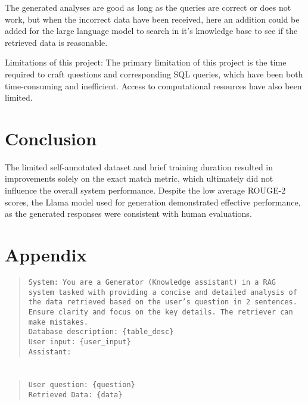 \documentclass[11pt]{article}
\begin{document}
The generated analyses are good as long as the queries are correct or does not work, but when the incorrect data have been received, here an addition could be added for the large language model to search in it's knowledge base to see if the retrieved data is reasonable.

Limitations of this project:
The primary limitation of this project is the time required to craft questions and corresponding SQL queries, which have been both time-consuming and inefficient. Access to computational resources have also been limited. 



\section{Conclusion}

The limited self-annotated dataset and brief training duration resulted in improvements solely on the exact match metric, which ultimately did not influence the overall system performance. 
Despite the low average ROUGE-2 scores, the Llama model used for generation demonstrated effective performance, as the generated responses were consistent with human evaluations.





\newpage
\appendix
\section{Appendix}

\label{sec:appendix}



\begin{quote}
\texttt{System: You are a Generator (Knowledge assistant) in a RAG system tasked with providing a concise and detailed analysis of the data retrieved based on the user's question in 2 sentences. Ensure clarity and focus on the key details. The retriever can make mistakes.}
\\
\texttt{Database description: \{table\_desc\}}
\\
\texttt{User input: \{user\_input\}}
\\
\texttt{Assistant:}
\label{append:8}
\end{quote}


\section{}
\begin{quote}
\texttt{User question: \{question\} }\\
\texttt{Retrieved Data: \{data\}}
\label{append:9}
\end{quote}
\end{document}
